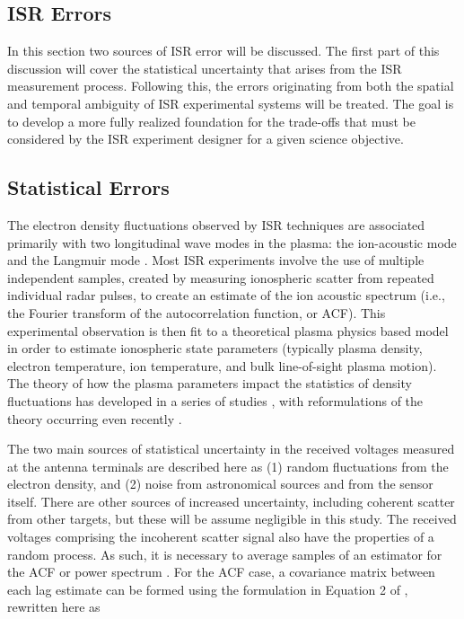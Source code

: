 \documentclass[draft,ras]{agutex}
\begin{document}
\begin{article}
\section{ISR Errors}

In this section two sources of ISR error will be discussed. The first part of this discussion will cover the statistical uncertainty that arises from the ISR measurement process. Following this, the errors originating from both the spatial and temporal ambiguity of ISR experimental systems will be treated. The goal is to develop a more fully realized foundation for the trade-offs that must be considered by the ISR experiment designer for a given science objective.

\subsection{Statistical Errors}

The electron density fluctuations observed by ISR techniques are associated primarily with two longitudinal wave modes in the plasma: the ion-acoustic mode and the Langmuir mode \citep{evans;isr}.  Most ISR experiments involve the use of multiple independent samples, created by measuring ionospheric scatter from repeated individual radar pulses, to create an estimate of the ion acoustic spectrum (i.e., the Fourier transform of the autocorrelation function, or ACF). This experimental observation is then fit to a theoretical plasma physics based model in order to estimate ionospheric state parameters (typically plasma density, electron temperature, ion temperature, and bulk line-of-sight plasma motion). The theory of how the plasma parameters impact the statistics of density fluctuations has developed in a series of studies \citep{gordon58,dougherty:farley1960, farleydougherty:ISR2, doughteryfarley:ISR3, hagfors1961}, with reformulations of the theory occurring even recently  \citep{kudeki:milla:1,kudeki:milla:2}. 

The two main sources of statistical uncertainty in the received voltages measured at the antenna terminals are described here as (1) random fluctuations from the electron density, and (2) noise from astronomical sources and from  the sensor itself. There are other sources of increased uncertainty, including coherent scatter from other targets, but these will be assume negligible in this study.  The received voltages comprising the incoherent scatter signal also have the properties of a random process. As such, it is necessary to average samples of an estimator for the ACF or power spectrum \citep{Diaz:2008co}.  For the ACF case, a covariance matrix between each lag estimate can be formed using the formulation in Equation 2 of \citet{hysell2008}, rewritten here as


\end{article}
\end{document}

